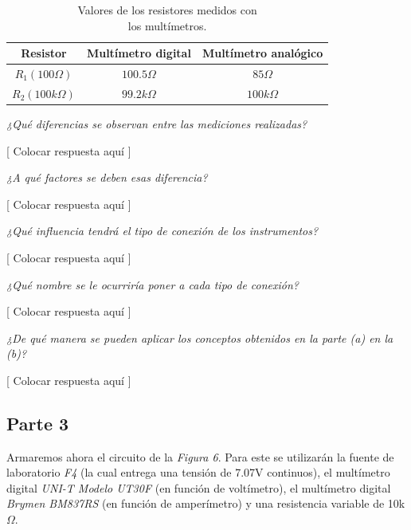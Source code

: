 \documentclass{article}
\begin{document}
\begin{table}[!hbt]
	\begin{center}
	\begin{tabular}{|c|c|c|}
		\hline
		\textbf{Resistor} & \textbf{Multímetro digital} & \textbf{Multímetro analógico} \\
		\hline
		$R_1 (100\Omega)$ & $100.5\Omega$ & $85\Omega$ \\
		\hline
		$R_2 (100k\Omega)$ & $99.2k\Omega$ & $100k\Omega$ \\
		\hline
	\end{tabular}
	\caption{Valores de los resistores medidos con\\ los multímetros.}
	\end{center}
\end{table}




\textit{¿Qué diferencias se observan entre las mediciones realizadas?}
\medskip

	[ Colocar respuesta aquí ]
\bigskip\bigskip


\textit{¿A qué factores se deben esas diferencia?}
\medskip

	[ Colocar respuesta aquí ]
\bigskip\bigskip


\textit{¿Qué influencia tendrá el tipo de conexión de los instrumentos?}
\medskip

	[ Colocar respuesta aquí ]
\bigskip


\textit{¿Qué nombre se le ocurriría poner a cada tipo de conexión?}
\medskip

	[ Colocar respuesta aquí ]
\bigskip


\textit{¿De qué manera se pueden aplicar los conceptos obtenidos en la parte (a) en la (b)?}
\medskip

	[ Colocar respuesta aquí ]
\bigskip\bigskip



\subsection{Parte 3}


	Armaremos ahora el circuito de la \textit{Figura 6}. Para este se utilizarán la fuente de laboratorio \textit{F4} (la cual entrega una tensión de 7.07V continuos), el multímetro digital \textit{UNI-T Modelo UT30F} (en función de voltímetro), el multímetro digital \textit{Brymen BM837RS} (en función de amperímetro) y una resistencia variable de 10k$\Omega$.
\bigskip
\end{document}
